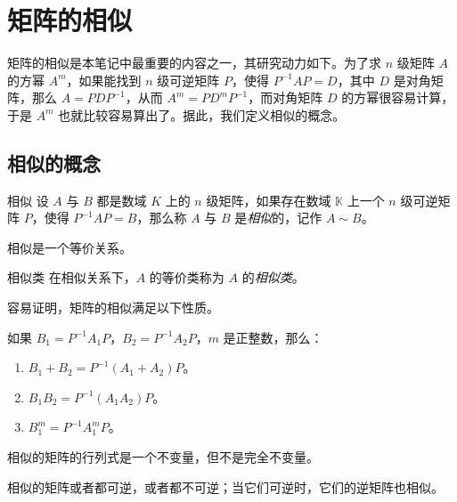 
\section{矩阵的相似}

矩阵的相似是本笔记中最重要的内容之一，其研究动力如下。为了求 $n$ 级矩阵 $A$ 的方幂 $A^m$，如果能找到 $n$ 级可逆矩阵 $P$，使得 $P^{-1} AP = D$，其中 $D$ 是对角矩阵，那么 $A = PDP^{-1}$，从而 $A^m = PD^m P^{-1}$，而对角矩阵 $D$ 的方幂很容易计算，于是 $A^m$ 也就比较容易算出了。据此，我们定义相似的概念。

\subsection{相似的概念}

\begin{definition}{相似}
	设 $A$ 与 $B$ 都是数域 $K$ 上的 $n$ 级矩阵，如果存在数域 $\mathbb K$ 上一个 $n$ 级可逆矩阵 $P$，使得 $P^{-1} A P = B$，那么称 $A$ 与 $B$ 是\emph{相似}的，记作 $A \sim B$。
\end{definition}

\begin{theorem}
	相似是一个等价关系。
\end{theorem}

\begin{definition}{相似类}
	在相似关系下，$A$ 的等价类称为 $A$ 的\emph{相似类}。
\end{definition}

容易证明，矩阵的相似满足以下性质。

\begin{theorem}[相似的运算性质]
	如果 $B_1 = P^{-1} A_1 P$，$B_2 = P^{-1} A_2 P$，$m$ 是正整数，那么：
	\begin{enumerate}
		\item $B_1 + B_2 = P^{-1} (A_1 + A_2) P$。
		\item $B_1 B_2 = P^{-1} (A_1 A_2) P$。
		\item $B_1^m = P^{-1} A_1^m P$。
	\end{enumerate}
\end{theorem}

\begin{theorem}
	相似的矩阵的行列式是一个不变量，但不是完全不变量。
\end{theorem}

\begin{theorem}
	相似的矩阵或者都可逆，或者都不可逆；当它们可逆时，它们的逆矩阵也相似。
\end{theorem}

